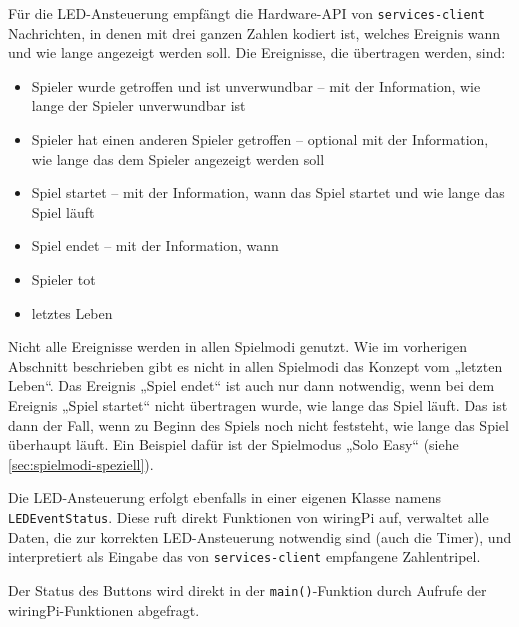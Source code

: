 Für die LED-Ansteuerung empfängt die Hardware-API von \texttt{services-client} Nachrichten, in denen
mit drei ganzen Zahlen kodiert ist, welches Ereignis wann und wie lange angezeigt werden soll.
Die Ereignisse, die übertragen werden, sind:
\begin{itemize}
  \item
    Spieler wurde getroffen und ist unverwundbar – mit der Information, wie lange der Spieler
    unverwundbar ist
  \item
    Spieler hat einen anderen Spieler getroffen – optional mit der Information, wie lange das dem
    Spieler angezeigt werden soll
  \item
    Spiel startet – mit der Information, wann das Spiel startet und wie lange das Spiel läuft
  \item
    Spiel endet – mit der Information, wann
  \item
    Spieler tot
  \item
    letztes Leben
\end{itemize}
Nicht alle Ereignisse werden in allen Spielmodi genutzt.
Wie im vorherigen Abschnitt beschrieben gibt es nicht in allen Spielmodi das Konzept vom
„letzten Leben“.
Das Ereignis „Spiel endet“ ist auch nur dann notwendig, wenn bei dem Ereignis „Spiel startet“ nicht
übertragen wurde, wie lange das Spiel läuft.
Das ist dann der Fall, wenn zu Beginn des Spiels noch nicht feststeht, wie lange das Spiel überhaupt
läuft.
Ein Beispiel dafür ist der Spielmodus „Solo Easy“ (siehe \cref{sec:spielmodi-speziell}).

Die LED-Ansteuerung erfolgt ebenfalls in einer eigenen Klasse namens \texttt{LEDEventStatus}.
Diese ruft direkt Funktionen von wiringPi auf, verwaltet alle Daten, die zur korrekten
LED-Ansteuerung notwendig sind (auch die Timer), und interpretiert als Eingabe das von
\texttt{services-client} empfangene Zahlentripel.

Der Status des Buttons wird direkt in der \texttt{main()}-Funktion durch Aufrufe der
wiringPi-Funktionen abgefragt.

